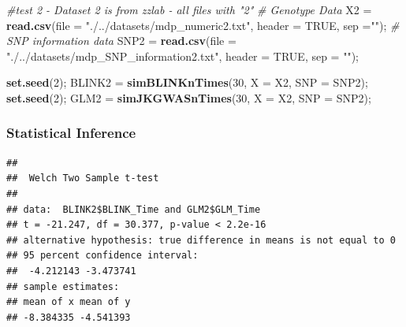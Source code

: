 \documentclass[
]{article}
\newenvironment{Shaded}{\begin{snugshade}}{\end{snugshade}}
\newcommand{\CommentTok}[1]{\textcolor[rgb]{0.56,0.35,0.01}{\textit{#1}}}
\newcommand{\DataTypeTok}[1]{\textcolor[rgb]{0.13,0.29,0.53}{#1}}
\newcommand{\DecValTok}[1]{\textcolor[rgb]{0.00,0.00,0.81}{#1}}
\newcommand{\KeywordTok}[1]{\textcolor[rgb]{0.13,0.29,0.53}{\textbf{#1}}}
\newcommand{\NormalTok}[1]{#1}
\newcommand{\OperatorTok}[1]{\textcolor[rgb]{0.81,0.36,0.00}{\textbf{#1}}}
\newcommand{\OtherTok}[1]{\textcolor[rgb]{0.56,0.35,0.01}{#1}}
\newcommand{\StringTok}[1]{\textcolor[rgb]{0.31,0.60,0.02}{#1}}
\begin{document}
\begin{Shaded}
\begin{Highlighting}[]
\CommentTok{\#test 2 {-} Dataset 2 is from zzlab {-} all files with "2"}
\CommentTok{\# Genotype Data}
\NormalTok{X2 =}\StringTok{ }\KeywordTok{read.csv}\NormalTok{(}\DataTypeTok{file =} \StringTok{"./../datasets/mdp\_numeric2.txt"}\NormalTok{, }\DataTypeTok{header =} \OtherTok{TRUE}\NormalTok{, }\DataTypeTok{sep =}\StringTok{""}\NormalTok{);}
\CommentTok{\# SNP information data}
\NormalTok{SNP2 =}\StringTok{ }\KeywordTok{read.csv}\NormalTok{(}\DataTypeTok{file =} \StringTok{"./../datasets/mdp\_SNP\_information2.txt"}\NormalTok{, }\DataTypeTok{header =} \OtherTok{TRUE}\NormalTok{, }\DataTypeTok{sep =} \StringTok{""}\NormalTok{);}
\end{Highlighting}
\end{Shaded}

\begin{Shaded}
\begin{Highlighting}[]
\KeywordTok{set.seed}\NormalTok{(}\DecValTok{2}\NormalTok{);}
\NormalTok{BLINK2 =}\StringTok{ }\KeywordTok{simBLINKnTimes}\NormalTok{(}\DecValTok{30}\NormalTok{, }\DataTypeTok{X =}\NormalTok{ X2, }\DataTypeTok{SNP =}\NormalTok{ SNP2);}
\KeywordTok{set.seed}\NormalTok{(}\DecValTok{2}\NormalTok{);}
\NormalTok{GLM2 =}\StringTok{ }\KeywordTok{simJKGWASnTimes}\NormalTok{(}\DecValTok{30}\NormalTok{, }\DataTypeTok{X =}\NormalTok{ X2, }\DataTypeTok{SNP =}\NormalTok{ SNP2);}
\end{Highlighting}
\end{Shaded}

\hypertarget{statistical-inference-2}{%
\subsubsection{Statistical Inference}\label{statistical-inference-2}}

\begin{Shaded}
\end{Shaded}

\begin{verbatim}
## 
##  Welch Two Sample t-test
## 
## data:  BLINK2$BLINK_Time and GLM2$GLM_Time
## t = -21.247, df = 30.377, p-value < 2.2e-16
## alternative hypothesis: true difference in means is not equal to 0
## 95 percent confidence interval:
##  -4.212143 -3.473741
## sample estimates:
## mean of x mean of y 
## -8.384335 -4.541393
\end{verbatim}
\end{document}
